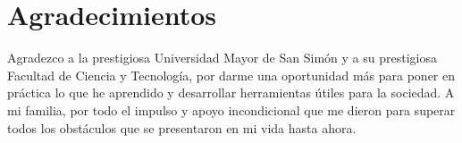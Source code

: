 \chapter{\centering Agradecimientos}

\begin{center}
    \begin{minipage}{14cm}
        Agradezco a la prestigiosa Universidad Mayor de San Simón y a su prestigiosa Facultad de Ciencia y Tecnología, por darme una oportunidad más para poner en práctica lo que he aprendido y desarrollar herramientas útiles para la sociedad. A mi familia, por todo el impulso y apoyo incondicional que me dieron para superar todos los obstáculos que se presentaron en mi vida hasta ahora. \\
    \end{minipage}
\end{center}
